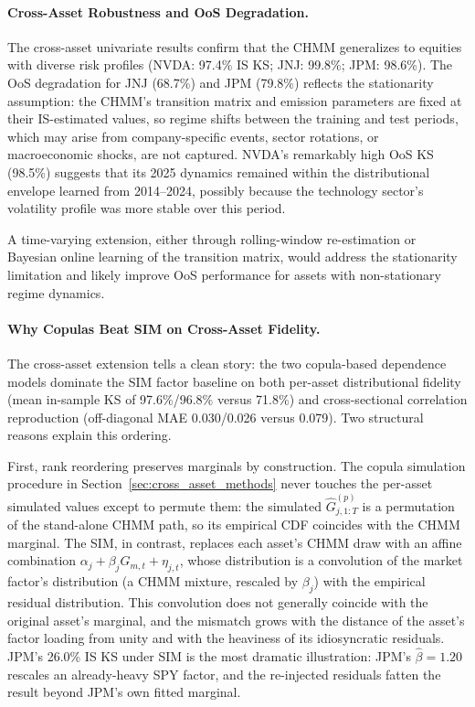 \paragraph{Cross-Asset Robustness and OoS Degradation.}
The cross-asset univariate results confirm that the CHMM generalizes to equities with diverse risk profiles (NVDA: 97.4\% IS KS; JNJ: 99.8\%; JPM: 98.6\%).
The OoS degradation for JNJ (68.7\%) and JPM (79.8\%) reflects the stationarity assumption: the CHMM's transition matrix and emission parameters are fixed at their IS-estimated values, so regime shifts between the training and test periods, which may arise from company-specific events, sector rotations, or macroeconomic shocks, are not captured.
NVDA's remarkably high OoS KS (98.5\%) suggests that its 2025 dynamics remained within the distributional envelope learned from 2014--2024, possibly because the technology sector's volatility profile was more stable over this period.

A time-varying extension, either through rolling-window re-estimation or Bayesian online learning of the transition matrix, would address the stationarity limitation and likely improve OoS performance for assets with non-stationary regime dynamics.

\paragraph{Why Copulas Beat SIM on Cross-Asset Fidelity.}
The cross-asset extension tells a clean story: the two copula-based dependence models dominate the SIM factor baseline on both per-asset distributional fidelity (mean in-sample KS of 97.6\%/96.8\% versus 71.8\%) and cross-sectional correlation reproduction (off-diagonal MAE 0.030/0.026 versus 0.079).
Two structural reasons explain this ordering.

First, rank reordering preserves marginals by construction.
The copula simulation procedure in Section~\ref{sec:cross_asset_methods} never touches the per-asset simulated values except to permute them: the simulated $\hat{G}_{j,1:T}^{(p)}$ is a permutation of the stand-alone CHMM path, so its empirical CDF coincides with the CHMM marginal.
The SIM, in contrast, replaces each asset's CHMM draw with an affine combination $\alpha_j + \beta_j G_{m,t} + \eta_{j,t}$, whose distribution is a convolution of the market factor's distribution (a CHMM mixture, rescaled by $\beta_j$) with the empirical residual distribution.
This convolution does not generally coincide with the original asset's marginal, and the mismatch grows with the distance of the asset's factor loading from unity and with the heaviness of its idiosyncratic residuals.
JPM's 26.0\% IS KS under SIM is the most dramatic illustration: JPM's $\hat{\beta} = 1.20$ rescales an already-heavy SPY factor, and the re-injected residuals fatten the result beyond JPM's own fitted marginal.


